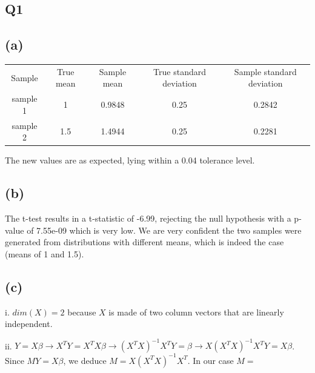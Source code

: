 \documentclass[11pt,a4paper,oneside]{report}
\begin{document}

\subsection*{Q1}
\subsection*{(a)}

\begin{center}
\begin{tabular}{c | c | c | c | c}
Sample & True mean & Sample mean & True standard deviation & Sample standard deviation\\
sample 1 & 1 & 0.9848 & 0.25 & 0.2842\\
sample 2 & 1.5 & 1.4944 & 0.25 & 0.2281\\
\end{tabular}
\end{center}

The new values are as expected, lying within a 0.04 tolerance level.

\subsection*{(b)}

The t-test results in a t-statistic of -6.99, rejecting the null hypothesis with a p-value of 7.55e-09 which is very low. We are very confident the two samples were generated from distributions with different means, which is indeed the case (means of 1 and 1.5).

\subsection*{(c)}

i. $dim(X) = 2$ because $X$ is made of two column vectors that are linearly independent.

ii. $Y = X\beta \to X^TY = X^TX\beta \to (X^TX)^{-1}X^TY = \beta \to X(X^TX)^{-1}X^TY = X\beta$. Since $MY = X\beta$, we deduce $M = X(X^TX)^{-1}X^T$. In our case $M = $
\end{document}
